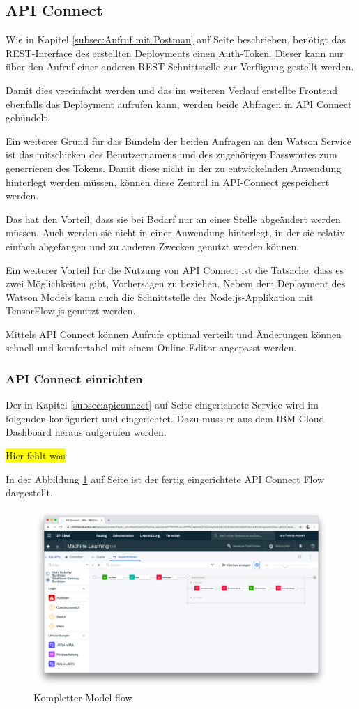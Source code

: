\subsection{API Connect}
Wie in Kapitel \ref{subsec:Aufruf mit Postman} auf Seite \pageref{subsec:Aufruf mit Postman} beschrieben, benötigt das
REST-Interface des erstellten Deployments einen Auth-Token. Dieser kann nur über den Aufruf einer anderen
REST-Schnittstelle zur Verfügung gestellt werden.

Damit dies vereinfacht werden und das im weiteren Verlauf erstellte Frontend ebenfalls das Deployment aufrufen kann,
werden beide Abfragen in API Connect gebündelt.

Ein weiterer Grund für das Bündeln der beiden Anfragen an den Watson Service ist das mitschicken des Benutzernamens und
des zugehörigen Passwortes zum generrieren des Tokens. Damit diese nicht in der zu entwickelnden Anwendung hinterlegt
werden müssen, können diese Zentral in API-Connect gespeichert werden.

Das hat den Vorteil, dass sie bei Bedarf nur an einer Stelle abgeändert werden müssen. Auch werden sie nicht in einer
Anwendung hinterlegt, in der sie relativ einfach abgefangen und zu anderen Zwecken genutzt werden können.

Ein weiterer Vorteil für die Nutzung von API Connect ist die Tatsache, dass es zwei Möglichkeiten gibt, Vorhersagen zu
beziehen. Nebem dem Deployment des Watson Models kann auch die Schnittstelle der Node.js-Applikation mit TensorFlow.js
genutzt werden.

Mittels API Connect können Aufrufe optimal verteilt und Änderungen können schnell und komfortabel mit einem Online-Editor
angepasst werden.

\subsubsection{API Connect einrichten}
Der in Kapitel \ref{subsec:apiconnect} auf Seite \pageref{subsec:apiconnect} eingerichtete Service wird im folgenden
konfiguriert und eingerichtet. Dazu muss er aus dem IBM Cloud Dashboard heraus aufgerufen werden.

\colorbox{yellow}{Hier fehlt was}

In der Abbildung \ref{fig:umsetzung_api_connect} auf Seite \pageref{fig:umsetzung_api_connect} ist der fertig
eingerichtete API Connect Flow dargestellt.

\begin{figure}[h]
    \centering
    \includegraphics[scale=0.26]{images/kapitel_3/api_connect.png}
    \caption{Kompletter Model flow}
    \label{fig:umsetzung_api_connect}
\end{figure}